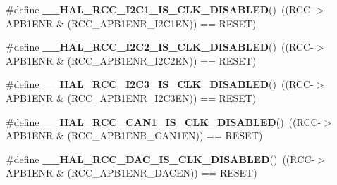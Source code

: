 \begin{DoxyCompactItemize}
\item 
\mbox{\label{group___r_c_c_ex___peripheral___clock___enable___disable___status_ga8868ab331b4bb14a1d5cc55c9133e4de}} 
\#define {\bfseries \+\_\+\+\_\+\+H\+A\+L\+\_\+\+R\+C\+C\+\_\+\+I2\+C1\+\_\+\+I\+S\+\_\+\+C\+L\+K\+\_\+\+D\+I\+S\+A\+B\+L\+ED}()~((R\+CC-\/$>$A\+P\+B1\+E\+NR \& (R\+C\+C\+\_\+\+A\+P\+B1\+E\+N\+R\+\_\+\+I2\+C1\+EN)) == R\+E\+S\+ET)
\item 
\mbox{\label{group___r_c_c_ex___peripheral___clock___enable___disable___status_gae051ecb26de5c5b44f1827923c9837a5}} 
\#define {\bfseries \+\_\+\+\_\+\+H\+A\+L\+\_\+\+R\+C\+C\+\_\+\+I2\+C2\+\_\+\+I\+S\+\_\+\+C\+L\+K\+\_\+\+D\+I\+S\+A\+B\+L\+ED}()~((R\+CC-\/$>$A\+P\+B1\+E\+NR \& (R\+C\+C\+\_\+\+A\+P\+B1\+E\+N\+R\+\_\+\+I2\+C2\+EN)) == R\+E\+S\+ET)
\item 
\mbox{\label{group___r_c_c_ex___peripheral___clock___enable___disable___status_ga8b791b360bab639782613994e9ef0aa6}} 
\#define {\bfseries \+\_\+\+\_\+\+H\+A\+L\+\_\+\+R\+C\+C\+\_\+\+I2\+C3\+\_\+\+I\+S\+\_\+\+C\+L\+K\+\_\+\+D\+I\+S\+A\+B\+L\+ED}()~((R\+CC-\/$>$A\+P\+B1\+E\+NR \& (R\+C\+C\+\_\+\+A\+P\+B1\+E\+N\+R\+\_\+\+I2\+C3\+EN)) == R\+E\+S\+ET)
\item 
\mbox{\label{group___r_c_c_ex___peripheral___clock___enable___disable___status_ga817f67e1c99ce380a0e399efd8d32db0}} 
\#define {\bfseries \+\_\+\+\_\+\+H\+A\+L\+\_\+\+R\+C\+C\+\_\+\+C\+A\+N1\+\_\+\+I\+S\+\_\+\+C\+L\+K\+\_\+\+D\+I\+S\+A\+B\+L\+ED}()~((R\+CC-\/$>$A\+P\+B1\+E\+NR \& (R\+C\+C\+\_\+\+A\+P\+B1\+E\+N\+R\+\_\+\+C\+A\+N1\+EN)) == R\+E\+S\+ET)
\item 
\mbox{\label{group___r_c_c_ex___peripheral___clock___enable___disable___status_gadb2c1ec9bfcc21993094506a39e08f33}} 
\#define {\bfseries \+\_\+\+\_\+\+H\+A\+L\+\_\+\+R\+C\+C\+\_\+\+D\+A\+C\+\_\+\+I\+S\+\_\+\+C\+L\+K\+\_\+\+D\+I\+S\+A\+B\+L\+ED}()~((R\+CC-\/$>$A\+P\+B1\+E\+NR \& (R\+C\+C\+\_\+\+A\+P\+B1\+E\+N\+R\+\_\+\+D\+A\+C\+EN)) == R\+E\+S\+ET)
\item 
\mbox{\label{group___r_c_c_ex___peripheral___clock___enable___disable___status_ga347b2b22378634cdeeef11daa132aa84}} 

\end{DoxyCompactItemize}
